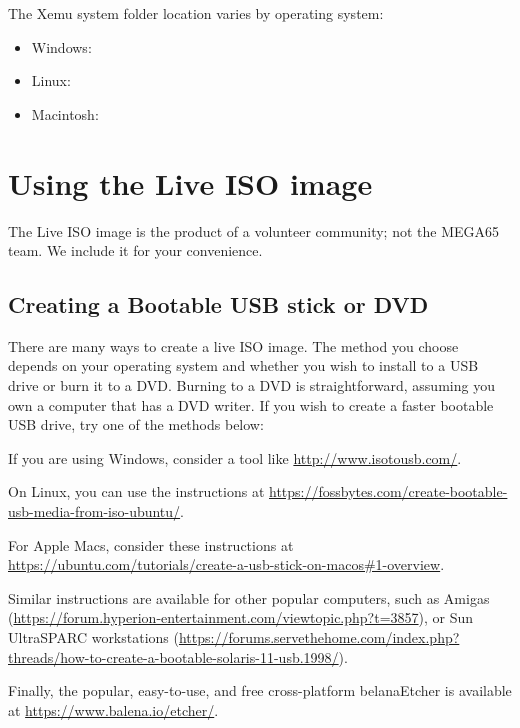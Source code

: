 The Xemu system folder location varies by operating system:

\begin{itemize}
    \item Windows:
    \item Linux:
    \item Macintosh:
\end{itemize}


\section{Using the Live ISO image}
\label{sec:live-iso-image}

The Live ISO image is the product of a volunteer community; not the MEGA65 team. We include it for your convenience.

\subsection{Creating a Bootable USB stick or DVD}

There are many ways to create a live ISO image. The method you choose depends on your operating system and whether you wish to install to a USB drive or burn it to a DVD. Burning to a DVD is straightforward, assuming you own a computer that has a DVD writer. If you wish to create a faster bootable USB drive, try one of the methods below:

If you are using Windows, consider a tool like \url{http://www.isotousb.com/}.

On Linux, you can use the instructions at \url{https://fossbytes.com/create-bootable-usb-media-from-iso-ubuntu/}.

For Apple Macs, consider these instructions at
\url{https://ubuntu.com/tutorials/create-a-usb-stick-on-macos#1-overview}.

Similar instructions are available for other popular computers, such as Amigas (\url{https://forum.hyperion-entertainment.com/viewtopic.php?t=3857}), or Sun UltraSPARC workstations (\url{https://forums.servethehome.com/index.php?threads/how-to-create-a-bootable-solaris-11-usb.1998/}).

Finally, the popular, easy-to-use, and free cross-platform belanaEtcher is available at \url{https://www.balena.io/etcher/}.


